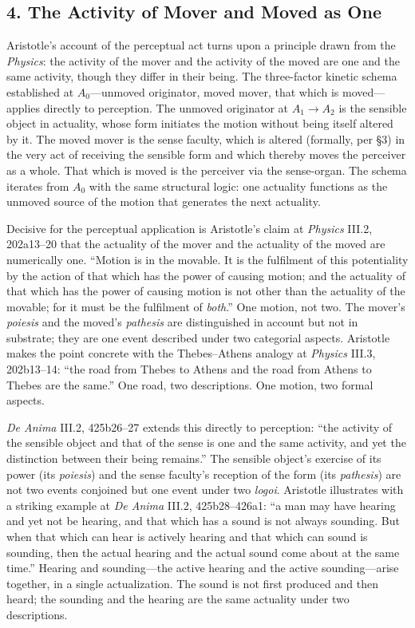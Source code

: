 \documentclass[12pt]{article}
\begin{document}
\subsection*{4. The Activity of Mover and Moved as One}

Aristotle's account of the perceptual act turns upon a principle drawn from the \textit{Physics}: the activity of the mover and the activity of the moved are one and the same activity, though they differ in their being. The three-factor kinetic schema established at $A_0$---unmoved originator, moved mover, that which is moved---applies directly to perception. The unmoved originator at $A_1 \to A_2$ is the sensible object in actuality, whose form initiates the motion without being itself altered by it. The moved mover is the sense faculty, which is altered (formally, per §3) in the very act of receiving the sensible form and which thereby moves the perceiver as a whole. That which is moved is the perceiver via the sense-organ. The schema iterates from $A_0$ with the same structural logic: one actuality functions as the unmoved source of the motion that generates the next actuality.

Decisive for the perceptual application is Aristotle's claim at \textit{Physics} III.2, 202a13--20 that the actuality of the mover and the actuality of the moved are numerically one. ``Motion is in the movable. It is the fulfilment of this potentiality by the action of that which has the power of causing motion; and the actuality of that which has the power of causing motion is not other than the actuality of the movable; for it must be the fulfilment of \textit{both}.'' One motion, not two. The mover's \textit{poiesis} and the moved's \textit{pathesis} are distinguished in account but not in substrate; they are one event described under two categorial aspects. Aristotle makes the point concrete with the Thebes--Athens analogy at \textit{Physics} III.3, 202b13--14: ``the road from Thebes to Athens and the road from Athens to Thebes are the same.'' One road, two descriptions. One motion, two formal aspects.

\textit{De Anima} III.2, 425b26--27 extends this directly to perception: ``the activity of the sensible object and that of the sense is one and the same activity, and yet the distinction between their being remains.'' The sensible object's exercise of its power (its \textit{poiesis}) and the sense faculty's reception of the form (its \textit{pathesis}) are not two events conjoined but one event under two \textit{logoi}. Aristotle illustrates with a striking example at \textit{De Anima} III.2, 425b28--426a1: ``a man may have hearing and yet not be hearing, and that which has a sound is not always sounding. But when that which can hear is actively hearing and that which can sound is sounding, then the actual hearing and the actual sound come about at the same time.'' Hearing and sounding---the active hearing and the active sounding---arise together, in a single actualization. The sound is not first produced and then heard; the sounding and the hearing are the same actuality under two descriptions.
\end{document}
